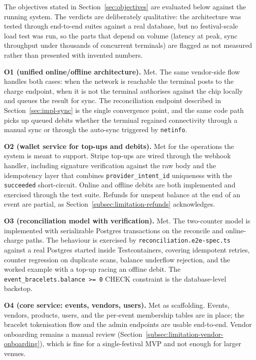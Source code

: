 The objectives stated in Section~\ref{sec:objectives} are evaluated below against the running system. The verdicts are deliberately qualitative: the architecture was tested through end-to-end suites against a real database, but no festival-scale load test was run, so the parts that depend on volume (latency at peak, sync throughput under thousands of concurrent terminals) are flagged as not measured rather than presented with invented numbers.

\textbf{O1 (unified online/offline architecture).} Met. The same vendor-side flow handles both cases: when the network is reachable the terminal posts to the charge endpoint, when it is not the terminal authorises against the chip locally and queues the result for sync. The reconciliation endpoint described in Section~\ref{sec:impl-sync} is the single convergence point, and the same code path picks up queued debits whether the terminal regained connectivity through a manual sync or through the auto-sync triggered by \texttt{netinfo}.

\textbf{O2 (wallet service for top-ups and debits).} Met for the operations the system is meant to support. Stripe top-ups are wired through the webhook handler, including signature verification against the raw body and the idempotency layer that combines \texttt{provider\_intent\_id} uniqueness with the \texttt{succeeded} short-circuit. Online and offline debits are both implemented and exercised through the test suite. Refunds for unspent balance at the end of an event are partial, as Section~\ref{subsec:limitation-refunds} acknowledges.

\textbf{O3 (reconciliation model with verification).} Met. The two-counter model is implemented with serializable Postgres transactions on the reconcile and online-charge paths. The behaviour is exercised by \texttt{reconciliation.e2e-spec.ts} against a real Postgres started inside Testcontainers, covering idempotent retries, counter regression on duplicate scans, balance underflow rejection, and the worked example with a top-up racing an offline debit. The \texttt{event\_bracelets.balance >= 0} CHECK constraint is the database-level backstop.

\textbf{O4 (core service: events, vendors, users).} Met as scaffolding. Events, vendors, products, users, and the per-event membership tables are in place; the bracelet tokenisation flow and the admin endpoints are usable end-to-end. Vendor onboarding remains a manual review (Section~\ref{subsec:limitation-vendor-onboarding}), which is fine for a single-festival MVP and not enough for larger venues.


